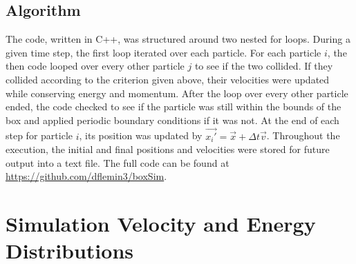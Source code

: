 \documentclass[12pt]{amsart}
\begin{document}
\subsection{Algorithm}

The code, written in C++, was structured around two nested for loops.  During a given time step, the first loop iterated over each particle.  For each particle $i$, the then code looped over every other particle $j$ to see if the two collided.  If they collided according to the criterion given above, their velocities were updated while conserving energy and momentum.  After the loop over every other particle ended, the code checked to see if the particle was still within the bounds of the box and applied periodic boundary conditions if it was not.  At the end of each step for particle $i$, its position was updated by $\vec{x_i'} = \vec{x} + \Delta t \vec{v}$.  Throughout the execution, the initial and final positions and velocities were stored for future output into a text file.  The full code can be found at \href{https://github.com/dflemin3/boxSim}{https://github.com/dflemin3/boxSim}.

\section{Simulation Velocity and Energy Distributions}
\end{document}
